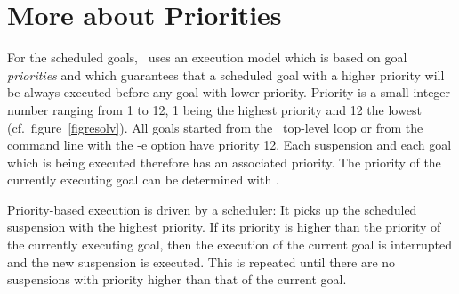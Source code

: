 \section{More about Priorities}
For the scheduled goals,
\eclipse\ uses an execution model which is based on goal {\it priorities}
and which guarantees that a scheduled goal with a higher priority
will be always executed before any goal with lower priority.
Priority is a small integer number ranging from 1 to 12,
1 being the highest priority and 12 the lowest
(cf.\ figure~\ref{figresolv}).
All goals started from the \eclipse\ top-level loop
or from the command line with the -e option have priority 12.
Each suspension and each goal which is being
executed therefore has an associated priority.
The priority of the currently executing goal can be determined
with .

Priority-based execution is driven by a scheduler:
It picks up the scheduled suspension with the highest priority.
If its priority is higher than the priority of the currently
executing goal, then the execution of the current goal
is interrupted and the new suspension is executed.
This is repeated until there are no suspensions
with priority higher than that of the current goal.


